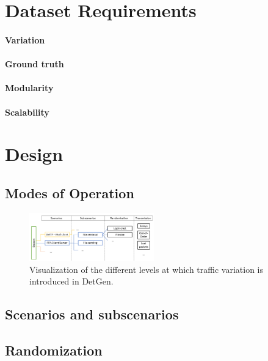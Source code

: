 \documentclass[sigconf]{acmart}
\begin{document}
\section{Dataset Requirements}\label{Sec:require}


\paragraph{Variation}
 
\paragraph{Ground truth} 

\paragraph{Modularity}

\paragraph{Scalability} 


\section{Design}\label{Sec:Design}

\subsection{Modes of Operation}


\begin{figure}
 \centering 
 \includegraphics[width=0.480\textwidth]{images/scenario_branching.PNG}
 \caption{Visualization of the different levels at which traffic variation is introduced in DetGen.}
 \label{Fig:branching}
\end{figure}


\subsection{Scenarios and subscenarios}
\label{Sec:Scenarios}

\subsection{Randomization}\label{Sec:randomsubscen}
\end{document}
